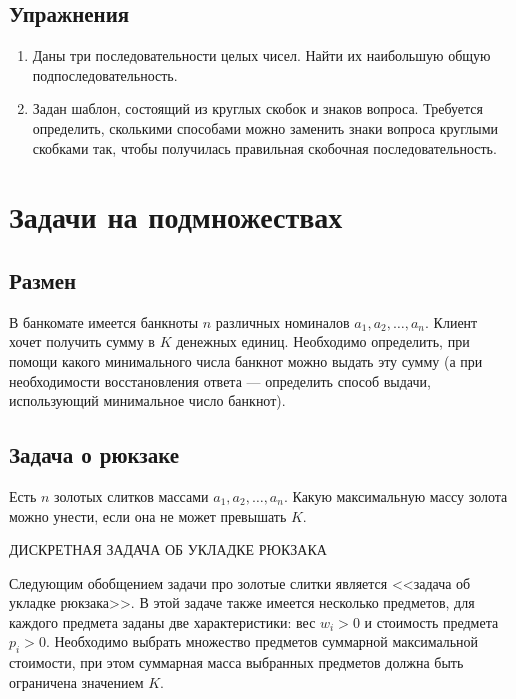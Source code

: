 \documentclass[14pt,openany]{book}
\begin{document}
\section{Упражнения}

\begin{enumerate}

\item Даны три последовательности целых чисел. Найти их наибольшую общую подпоследовательность.

\item Задан шаблон, состоящий из круглых скобок и знаков вопроса. Требуется определить, сколькими
      способами можно заменить знаки вопроса круглыми скобками так, чтобы получилась правильная
      скобочная последовательность.

\end{enumerate}

\chapter{Задачи на подмножествах}

\section{Размен}

В банкомате имеется банкноты $n$ различных номиналов $a_1, a_2, \ldots, a_n$. Клиент хочет получить сумму в $K$ денежных единиц. Необходимо определить, при помощи какого минимального числа банкнот можно выдать эту сумму (а при необходимости восстановления ответа --- определить способ выдачи, использующий минимальное число банкнот).

\section{Задача о рюкзаке}

Есть $n$ золотых слитков массами $a_1, a_2, \ldots, a_n$. Какую максимальную массу золота можно унести, если она не может превышать $K$.

ДИСКРЕТНАЯ ЗАДАЧА ОБ УКЛАДКЕ РЮКЗАКА

Следующим обобщением задачи про золотые слитки является <<задача об укладке рюкзака>>. В этой задаче также имеется несколько предметов, для каждого предмета заданы две характеристики: вес $w_i > 0$ и стоимость предмета $p_i > 0$. Необходимо выбрать множество предметов суммарной максимальной стоимости, при этом суммарная масса выбранных предметов должна быть ограничена значением $K$.
\end{document}
